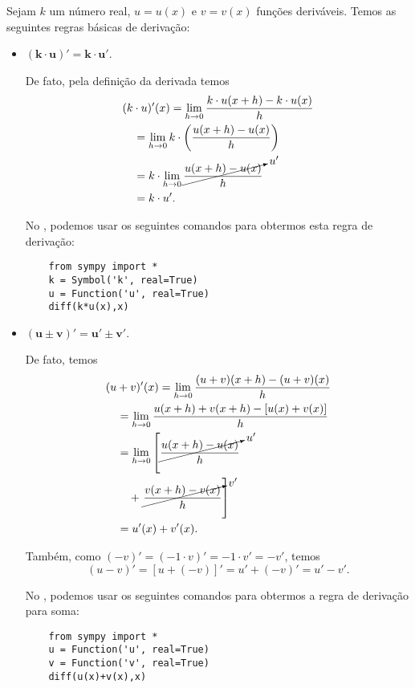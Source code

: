 Sejam $k$ um número real, $u = u(x)$ e $v = v(x)$ funções deriváveis. Temos as seguintes regras básicas de derivação:
\begin{itemize}
\item $\pmb{(k\cdot u)' = k\cdot u'}$.

  De fato, pela definição da derivada temos
  \begin{align}
    & (k\cdot u)'(x) = \lim_{h\to 0} \frac{k\cdot u(x+h)-k\cdot u(x)}{h} \\
    & \text{}\quad = \lim_{h\to 0} k\cdot \left(\frac{u(x+h)-u(x)}{h}\right) \\
    & \text{}\quad = k\cdot \lim_{h\to 0} \cancelto{u'}{\frac{u(x+h)-u(x)}{h}} \\
    & \text{}\quad = k\cdot u'.
  \end{align}
  
  \ifispython
  No \sympy, podemos usar os seguintes comandos para obtermos esta regra de derivação:
  \begin{lstlisting}
    from sympy import *
    k = Symbol('k', real=True)
    u = Function('u', real=True)
    diff(k*u(x),x)
  \end{lstlisting}
  \fi

\item $\pmb{(u\pm v)' = u'\pm v'}$.

  De fato, temos
  \begin{align}
    & (u + v)'(x) = \lim_{h\to 0} \frac{(u + v)(x+h)-(u + v)(x)}{h}\\
    & \text{}\quad = \lim_{h\to 0} \frac{u(x+h)+v(x+h)-[u(x)+v(x)]}{h}\\
    & \text{}\quad = \lim_{h\to 0} \left[\cancelto{u'}{\frac{u(x+h)-u(x)}{h}} \right. \\
    & \text{}\qquad + \left. \cancelto{v'}{\frac{v(x+h)-v(x)}{h}}\right]\\
    & \text{}\quad = u'(x) + v'(x).
  \end{align}

  Também, como $(-v)' = (-1\cdot v)' = -1\cdot v' = -v'$, temos
  \begin{equation}
    (u-v)' = [u+(-v)]' = u' + (-v)' = u' - v'.
  \end{equation}
  
  \ifispython
  No \sympy, podemos usar os seguintes comandos para obtermos a regra de derivação para soma:
  \begin{lstlisting}
    from sympy import *
    u = Function('u', real=True)
    v = Function('v', real=True)
    diff(u(x)+v(x),x)
  \end{lstlisting}
  \fi
\end{itemize}

